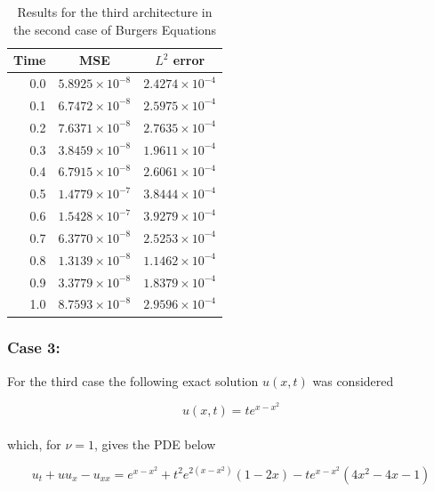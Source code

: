\documentclass[12pt,letterpaper]{article}
\begin{document}
    \begin{table}[H]
      \begin{center}
      \begin{tabular}{ r | c  c }
      \textbf{Time} & \textbf{MSE} & \textbf{$L^2$ error} \\ \hline
      0.0 & $ 5.8925\times 10^{-8}$ & $ 2.4274\times 10^{-4} $ \\
      0.1 & $ 6.7472\times 10^{-8}$ & $ 2.5975\times 10^{-4} $ \\
      0.2 & $ 7.6371\times 10^{-8}$ & $ 2.7635\times 10^{-4} $ \\
      0.3 & $ 3.8459\times 10^{-8}$ & $ 1.9611\times 10^{-4} $ \\
      0.4 & $ 6.7915\times 10^{-8}$ & $ 2.6061\times 10^{-4} $ \\
      0.5 & $ 1.4779\times 10^{-7}$ & $ 3.8444\times 10^{-4} $ \\
      0.6 & $ 1.5428\times 10^{-7}$ & $ 3.9279\times 10^{-4} $ \\
      0.7 & $ 6.3770\times 10^{-8}$ & $ 2.5253\times 10^{-4} $ \\
      0.8 & $ 1.3139\times 10^{-8}$ & $ 1.1462\times 10^{-4} $ \\
      0.9 & $ 3.3779\times 10^{-8}$ & $ 1.8379\times 10^{-4} $ \\
      1.0 & $ 8.7593\times 10^{-8}$ & $ 2.9596\times 10^{-4} $ \\
      \end{tabular}
      \caption{Results for the third architecture in the second case of Burgers Equations}
      \label{tab:B23}
      \end{center}
      \end{table}  

  \subsubsection*{Case 3:}

  For the third case the following exact solution $u(x,t)$ was considered
  
  $$u(x,t) = t e^{x-x^2}$$\\
  
  which, for $\nu=1$, gives the PDE below
  
  \begin{equation}
    \label{B3}
    u_t + u u_x - u_{xx} = e^{x-x^2} + t^2 e^{2(x-x^2)}(1-2x) - t e^{x-x^2}(4x^2 - 4x - 1)
  \end{equation}
  
\end{document}
